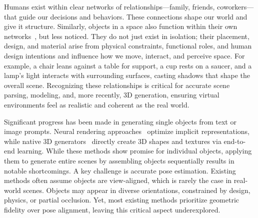 

Humans exist within clear networks of relationships—family, friends, coworkers—that guide our decisions and behaviors. These connections shape our world and give it structure. Similarly, objects in a space also function within their own networks~\cite{latour2005reassembling}, but less noticed. They do not just exist in isolation; their placement, design, and material arise from physical constraints, functional roles, and human design intentions and influence how we move, interact, and perceive space. For example, a chair leans against a table for support, a cup rests on a saucer, and a lamp’s light interacts with surrounding surfaces, casting shadows that shape the overall scene. Recognizing these relationships is critical for accurate scene parsing, modeling, and, more recently, 3D generation, ensuring virtual environments feel as realistic and coherent as the real world.

Significant progress has been made in generating single objects from text or image prompts. Neural rendering approaches~\cite{poole2022dreamfusion,wang2024prolificdreamer} optimize implicit representations, while native 3D generators~\cite{zhang20233dshape2vecset,zhang2024clay,xiang2024structured} directly create 3D shapes and textures via end-to-end learning. While these methods show promise for individual objects, applying them to generate entire scenes by assembling objects sequentially results in notable shortcomings. A key challenge is accurate pose estimation. Existing methods often assume objects are view-aligned, which is rarely the case in real-world scenes. Objects may appear in diverse orientations, constrained by design, physics, or partial occlusion. Yet, most existing methods prioritize geometric fidelity over pose alignment, leaving this critical aspect underexplored.

